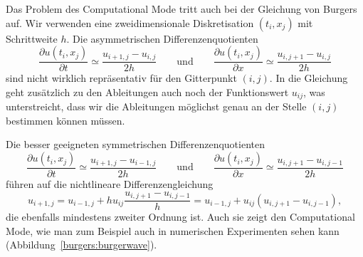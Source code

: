 Das Problem des Computational Mode tritt auch bei der Gleichung von Burgers
auf.
Wir verwenden eine zweidimensionale Diskretisation $(t_i, x_j)$ mit
Schrittweite $h$.
Die asymmetrischen Differenzenquotienten
\[
\frac{\partial u(t_i,x_j)}{\partial t}
\simeq
\frac{u_{i+1,j} - u_{i,j}}{2h}
\qquad\text{und}\qquad
\frac{\partial u(t_i, x_j)}{\partial x}
\simeq
\frac{u_{i,j+1} - u_{i,j}}{2h}
\]
sind nicht wirklich repräsentativ für den Gitterpunkt $(i,j)$.
In die Gleichung geht zusätzlich zu den Ableitungen auch noch der
Funktionswert $u_{ij}$, was unterstreicht, dass wir die Ableitungen
möglichst genau an der Stelle $(i,j)$ bestimmen können müssen.

Die besser geeigneten symmetrischen Differenzenquotienten 
\[
\frac{\partial u(t_i,x_j)}{\partial t}
\simeq
\frac{u_{i+1,j} - u_{i-1,j}}{2h}
\qquad\text{und}\qquad
\frac{\partial u(t_i, x_j)}{\partial x}
\simeq
\frac{u_{i,j+1} - u_{i,j-1}}{2h}
\]
führen auf die nichtlineare Differenzengleichung
\begin{equation}
u_{i+1,j}
= 
u_{i-1,j}
+
h
u_{ij}\frac{u_{i,j+1}-u_{i,j-1}}{h}
=
u_{i-1,j}
+
u_{ij}(u_{i,j+1}-u_{i,j-1}),
\label{burgers:diffgleichung}
\end{equation}
die ebenfalls mindestens zweiter Ordnung ist.
Auch sie zeigt den Computational Mode, wie man zum Beispiel auch
in numerischen Experimenten sehen kann (Abbildung~\ref{burgers:burgerwave}).





